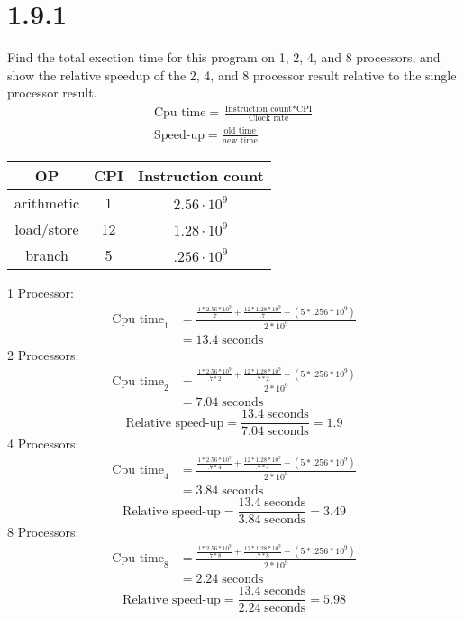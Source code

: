 \documentclass[12pt]{article}
\begin{document}
\section*{1.9.1}
Find the total exection time for this program on 1, 2, 4, and 8 
processors, and show the relative speedup of the 2, 4, and 8 processor result relative
to the single processor result.
\begin{gather*}
	\text{Cpu time} = \frac{\text{Instruction count}*\text{CPI}}{\text{Clock rate}}\\
	\text{Speed-up} = \frac{\text{old time}}{\text{new time}}
\end{gather*}
\begin{center}
	\begin{tabular}{|c|c|c|}
		\hline
		OP & CPI & Instruction count \\
		\hline
		arithmetic & 1 & $2.56\cdot{10^9}$ \\
		\hline
		load/store & 12 & $1.28\cdot{10^9}$ \\
		\hline
		branch & 5 & $.256\cdot{10^9}$ \\
		\hline
	\end{tabular}
\end{center}
1 Processor:
	\begin{align*}
	\text{Cpu time}_{1} &= \frac{\frac{1*2.56*10^9}{.7}+\frac{12*1.28*10^9}{.7}+(5*.256*10^9)}{2*10^9} \\
	&= 13.4\;\text{seconds}
	\end{align*}
2 Processors:
	\begin{align*}
	\text{Cpu time}_{2} &= \frac{\frac{1*2.56*10^9}{.7*2}+\frac{12*1.28*10^9}{.7*2}+(5*.256*10^9)}{2*10^9} \\
	&= 7.04\;\text{seconds}
	\end{align*}
	\[\text{Relative speed-up} = \frac{13.4\;\text{seconds}}{7.04\;\text{seconds}} = 1.9
	\]
4 Processors:
	\begin{align*}
	\text{Cpu time}_{4} &= \frac{\frac{1*2.56*10^9}{.7*4}+\frac{12*1.28*10^9}{.7*4}+(5*.256*10^9)}{2*10^9} \\
	&= 3.84\;\text{seconds}
	\end{align*}
	\[\text{Relative speed-up} = \frac{13.4\;\text{seconds}}{3.84\;\text{seconds}} = 3.49
	\]
8 Processors:
	\begin{align*}
	\text{Cpu time}_{8} &= \frac{\frac{1*2.56*10^9}{.7*8}+\frac{12*1.28*10^9}{.7*8}+(5*.256*10^9)}{2*10^9} \\
	&= 2.24\;\text{seconds}
	\end{align*}
	\[\text{Relative speed-up} = \frac{13.4\;\text{seconds}}{2.24\;\text{seconds}} = 5.98
	\]
\end{document}
